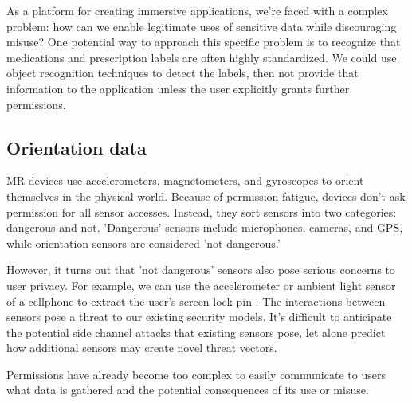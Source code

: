 As a platform for creating immersive applications, we're faced with a complex problem: how can we enable legitimate uses of sensitive data while discouraging misuse? One potential way to approach this specific problem is to recognize that medications and prescription labels are often highly standardized. We could use object recognition techniques to detect the labels, then not provide that information to the application unless the user explicitly grants further permissions.

\subsection{Orientation data}

MR devices use accelerometers, magnetometers, and gyroscopes to orient themselves in the physical world. Because of permission fatigue, devices don't ask permission for all sensor accesses. Instead, they sort sensors into two categories: dangerous and not. 'Dangerous' sensors include microphones, cameras, and GPS, while orientation sensors are considered 'not dangerous.'

However, it turns out that 'not dangerous' sensors also pose serious concerns to user privacy. For example, we can use the accelerometer or ambient light sensor of a cellphone to extract the user's screen lock pin \cite{aviv2012practicality} \cite{spreitzer2018systematic}. The interactions between sensors pose a threat to our existing security models. It's difficult to anticipate the potential side channel attacks that existing sensors pose, let alone predict how additional sensors may create novel threat vectors.

Permissions have already become too complex to easily communicate to users what data is gathered and the potential consequences of its use or misuse.
